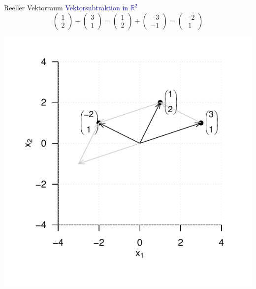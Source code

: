 \documentclass[
  8pt,
  ignorenonframetext,
]{beamer}
\begin{document}
\begin{frame}{Reeller Vektorraum}
\protect\hypertarget{reeller-vektorraum-7}{}
\textcolor{darkblue}{Vektorsubtraktion in $\mathbb{R}^2$} \vspace{2mm}
\small \begin{equation}
\begin{pmatrix}
1 \\ 2
\end{pmatrix}
-
\begin{pmatrix}
3 \\ 1
\end{pmatrix}
=
\begin{pmatrix}
1 \\ 2
\end{pmatrix}
+
\begin{pmatrix}
-3 \\ -1
\end{pmatrix}
=
\begin{pmatrix}
-2 \\ \,\, 1
\end{pmatrix}
\end{equation} \vspace{-2mm}

\begin{center}\includegraphics[width=0.5\linewidth]{2_Abbildungen/mvda_2_vektorsubtraktion_R2} \end{center}
\end{frame}
\end{document}
